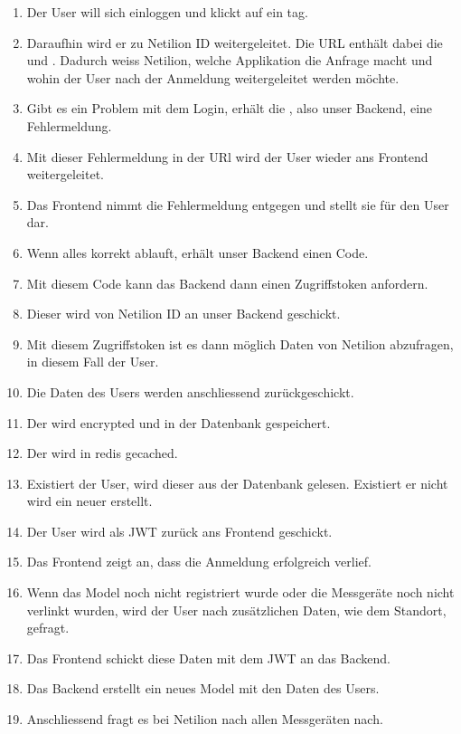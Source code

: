 \begin{enumerate}
  \item Der User will sich einloggen und klickt auf ein  tag.
  \item Daraufhin wird er zu Netilion ID weitergeleitet. Die URL enthält dabei die  und \newline{}. Dadurch weiss Netilion, welche Applikation die Anfrage macht und wohin der User nach der Anmeldung weitergeleitet werden möchte.
  \item Gibt es ein Problem mit dem Login, erhält die , also unser Backend, eine Fehlermeldung.
  \item Mit dieser Fehlermeldung in der URl wird der User wieder ans Frontend weitergeleitet.
  \item Das Frontend nimmt die Fehlermeldung entgegen und stellt sie für den User dar.
  \item Wenn alles korrekt ablauft, erhält unser Backend einen Code.
  \item Mit diesem Code kann das Backend dann einen Zugriffstoken anfordern.
  \item Dieser wird von Netilion ID an unser Backend geschickt.
  \item Mit diesem Zugriffstoken ist es dann möglich Daten von Netilion abzufragen, in diesem Fall der User.
  \item Die Daten des Users werden anschliessend zurückgeschickt.
  \item Der  wird encrypted und in der Datenbank gespeichert.
  \item Der  wird in redis gecached.
  \item Existiert der User, wird dieser aus der Datenbank gelesen. Existiert er nicht wird ein neuer erstellt.
  \item Der User wird als JWT zurück ans Frontend geschickt.
  \item Das Frontend zeigt an, dass die Anmeldung erfolgreich verlief.
  \item Wenn das Model noch nicht registriert wurde oder die Messgeräte noch nicht verlinkt wurden, wird der User nach zusätzlichen Daten, wie dem Standort, gefragt.
  \item Das Frontend schickt diese Daten mit dem JWT an das Backend.
  \item Das Backend erstellt ein neues Model mit den Daten des Users.
  \item Anschliessend fragt es bei Netilion nach allen Messgeräten nach.

\end{enumerate}
